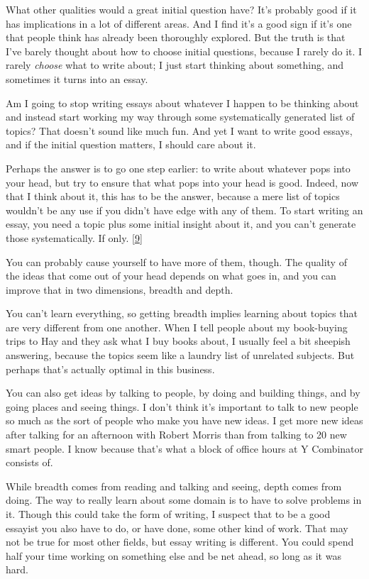 What other qualities would a great initial question have? It's probably
good if it has implications in a lot of different areas. And I find it's
a good sign if it's one that people think has already been thoroughly
explored. But the truth is that I've barely thought about how to choose
initial questions, because I rarely do it. I rarely \emph{choose} what
to write about; I just start thinking about something, and sometimes it
turns into an essay.

Am I going to stop writing essays about whatever I happen to be thinking
about and instead start working my way through some systematically
generated list of topics? That doesn't sound like much fun. And yet I
want to write good essays, and if the initial question matters, I should
care about it.

Perhaps the answer is to go one step earlier: to write about whatever
pops into your head, but try to ensure that what pops into your head is
good. Indeed, now that I think about it, this has to be the answer,
because a mere list of topics wouldn't be any use if you didn't have
edge with any of them. To start writing an essay, you need a topic plus
some initial insight about it, and you can't generate those
systematically. If only. {[}\hyperref[f9n]{9}{]}

You can probably cause yourself to have more of them, though. The
quality of the ideas that come out of your head depends on what goes in,
and you can improve that in two dimensions, breadth and depth.

You can't learn everything, so getting breadth implies learning about
topics that are very different from one another. When I tell people
about my book-buying trips to Hay and they ask what I buy books about, I
usually feel a bit sheepish answering, because the topics seem like a
laundry list of unrelated subjects. But perhaps that's actually optimal
in this business.

You can also get ideas by talking to people, by doing and building
things, and by going places and seeing things. I don't think it's
important to talk to new people so much as the sort of people who make
you have new ideas. I get more new ideas after talking for an afternoon
with Robert Morris than from talking to 20 new smart people. I know
because that's what a block of office hours at Y Combinator consists of.

While breadth comes from reading and talking and seeing, depth comes
from doing. The way to really learn about some domain is to have to
solve problems in it. Though this could take the form of writing, I
suspect that to be a good essayist you also have to do, or have done,
some other kind of work. That may not be true for most other fields, but
essay writing is different. You could spend half your time working on
something else and be net ahead, so long as it was hard.

